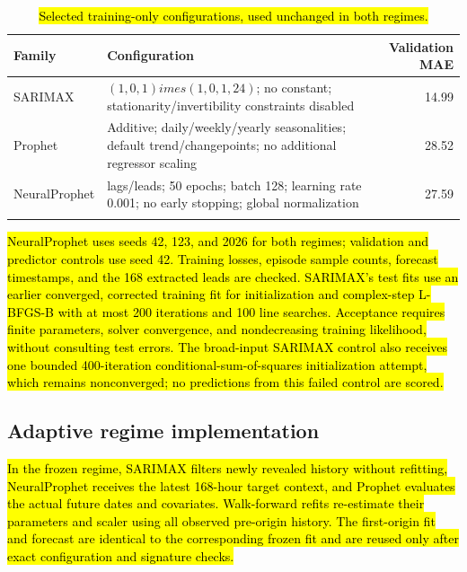 \documentclass[pdflatex,sn-basic,Numbered]{sn-jnl}
\newcommand{\rev}[1]{\hl{#1}}
\begin{document}
\begin{table}[htbp]
\caption{\rev{Selected training-only configurations, used unchanged in both regimes.}}
\label{tab:configuration}
\begingroup\small\setlength{\tabcolsep}{4pt}
\begin{tabularx}{\linewidth}{@{}l>{\raggedright\arraybackslash}Xr@{}}
\toprule
Family & Configuration & Validation MAE \\
\midrule
SARIMAX & $(1,0,1)	imes(1,0,1,24)$; no constant; stationarity/invertibility constraints disabled & 14.99 \\
Prophet & Additive; daily/weekly/yearly seasonalities; default trend/changepoints; no additional regressor scaling & 28.52 \\
NeuralProphet & 168 lags/leads; 50 epochs; batch 128; learning rate 0.001; no early stopping; global normalization & 27.59 \\
\botrule
\end{tabularx}\endgroup
\end{table}

\rev{NeuralProphet uses seeds 42, 123, and 2026 for both regimes; validation and predictor controls use seed 42. Training losses, episode sample counts, forecast timestamps, and the 168 extracted leads are checked. SARIMAX's test fits use an earlier converged, corrected training fit for initialization and complex-step L-BFGS-B with at most 200 iterations and 100 line searches. Acceptance requires finite parameters, solver convergence, and nondecreasing training likelihood, without consulting test errors. The broad-input SARIMAX control also receives one bounded 400-iteration conditional-sum-of-squares initialization attempt, which remains nonconverged; no predictions from this failed control are scored.}

\subsection{Adaptive regime implementation}\label{subsec:impl_regimes}

\rev{In the frozen regime, SARIMAX filters newly revealed history without refitting, NeuralProphet receives the latest 168-hour target context, and Prophet evaluates the actual future dates and covariates. Walk-forward refits re-estimate their parameters and scaler using all observed pre-origin history. The first-origin fit and forecast are identical to the corresponding frozen fit and are reused only after exact configuration and signature checks.}
\end{document}
